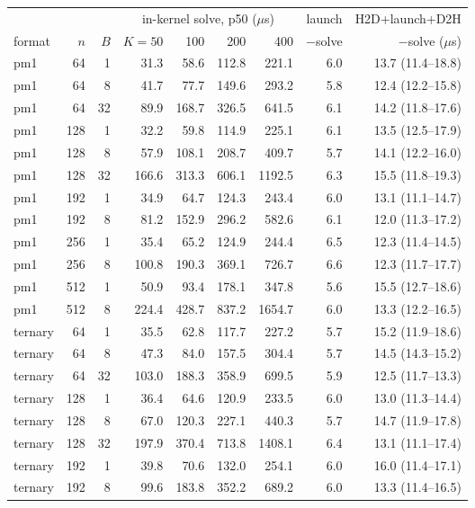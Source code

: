 \begin{tabular}{lrrrrrrrr}\toprule
 & & & \multicolumn{4}{c}{in-kernel solve, p50 ($\mu$s)} & launch & H2D+launch+D2H \\
\cmidrule(lr){4-7}
format & $n$ & $B$ & $K{=}50$ & 100 & 200 & 400 & $-$solve & $-$solve ($\mu$s) \\ \midrule
pm1 & 64 & 1 & 31.3 & 58.6 & 112.8 & 221.1 & 6.0 & 13.7 (11.4--18.8) \\
pm1 & 64 & 8 & 41.7 & 77.7 & 149.6 & 293.2 & 5.8 & 12.4 (12.2--15.8) \\
pm1 & 64 & 32 & 89.9 & 168.7 & 326.5 & 641.5 & 6.1 & 14.2 (11.8--17.6) \\
pm1 & 128 & 1 & 32.2 & 59.8 & 114.9 & 225.1 & 6.1 & 13.5 (12.5--17.9) \\
pm1 & 128 & 8 & 57.9 & 108.1 & 208.7 & 409.7 & 5.7 & 14.1 (12.2--16.0) \\
pm1 & 128 & 32 & 166.6 & 313.3 & 606.1 & 1192.5 & 6.3 & 15.5 (11.8--19.3) \\
pm1 & 192 & 1 & 34.9 & 64.7 & 124.3 & 243.4 & 6.0 & 13.1 (11.1--14.7) \\
pm1 & 192 & 8 & 81.2 & 152.9 & 296.2 & 582.6 & 6.1 & 12.0 (11.3--17.2) \\
pm1 & 256 & 1 & 35.4 & 65.2 & 124.9 & 244.4 & 6.5 & 12.3 (11.4--14.5) \\
pm1 & 256 & 8 & 100.8 & 190.3 & 369.1 & 726.7 & 6.6 & 12.3 (11.7--17.7) \\
pm1 & 512 & 1 & 50.9 & 93.4 & 178.1 & 347.8 & 5.6 & 15.5 (12.7--18.6) \\
pm1 & 512 & 8 & 224.4 & 428.7 & 837.2 & 1654.7 & 6.0 & 13.3 (12.2--16.5) \\
ternary & 64 & 1 & 35.5 & 62.8 & 117.7 & 227.2 & 5.7 & 15.2 (11.9--18.6) \\
ternary & 64 & 8 & 47.3 & 84.0 & 157.5 & 304.4 & 5.7 & 14.5 (14.3--15.2) \\
ternary & 64 & 32 & 103.0 & 188.3 & 358.9 & 699.5 & 5.9 & 12.5 (11.7--13.3) \\
ternary & 128 & 1 & 36.4 & 64.6 & 120.9 & 233.5 & 6.0 & 13.0 (11.3--14.4) \\
ternary & 128 & 8 & 67.0 & 120.3 & 227.1 & 440.3 & 5.7 & 14.7 (11.9--17.8) \\
ternary & 128 & 32 & 197.9 & 370.4 & 713.8 & 1408.1 & 6.4 & 13.1 (11.1--17.4) \\
ternary & 192 & 1 & 39.8 & 70.6 & 132.0 & 254.1 & 6.0 & 16.0 (11.4--17.1) \\
ternary & 192 & 8 & 99.6 & 183.8 & 352.2 & 689.2 & 6.0 & 13.3 (11.4--16.5) \\

\end{tabular}
